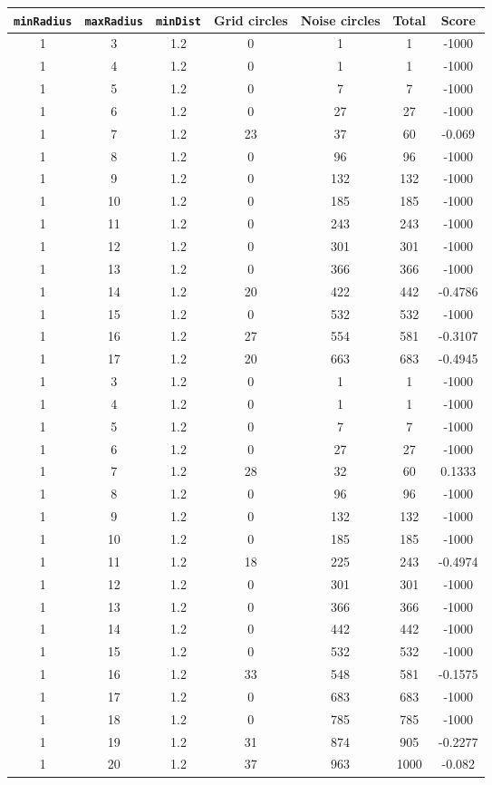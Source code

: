 \documentclass[letterpaper, 12pt]{article}
\begin{document}
\begin{longtable}{|c|c|c|c|c|c|c|}
\hline
\textbf{\texttt{minRadius}} & \textbf{\texttt{maxRadius}} & \textbf{\texttt{minDist}} & \textbf{Grid circles} & \textbf{Noise circles} & \textbf{Total} & \textbf{Score} \\
\hline
1 & 3 & 1.2 & 0 & 1 & 1 & -1000 \\
\hline
1 & 4 & 1.2 & 0 & 1 & 1 & -1000 \\
\hline
1 & 5 & 1.2 & 0 & 7 & 7 & -1000 \\
\hline
1 & 6 & 1.2 & 0 & 27 & 27 & -1000 \\
\hline
1 & 7 & 1.2 & 23 & 37 & 60 & -0.069 \\
\hline
1 & 8 & 1.2 & 0 & 96 & 96 & -1000 \\
\hline
1 & 9 & 1.2 & 0 & 132 & 132 & -1000 \\
\hline
1 & 10 & 1.2 & 0 & 185 & 185 & -1000 \\
\hline
1 & 11 & 1.2 & 0 & 243 & 243 & -1000 \\
\hline
1 & 12 & 1.2 & 0 & 301 & 301 & -1000 \\
\hline
1 & 13 & 1.2 & 0 & 366 & 366 & -1000 \\
\hline
1 & 14 & 1.2 & 20 & 422 & 442 & -0.4786 \\
\hline
1 & 15 & 1.2 & 0 & 532 & 532 & -1000 \\
\hline
1 & 16 & 1.2 & 27 & 554 & 581 & -0.3107 \\
\hline
1 & 17 & 1.2 & 20 & 663 & 683 & -0.4945 \\
\hline
1 & 3 & 1.2 & 0 & 1 & 1 & -1000 \\
\hline
1 & 4 & 1.2 & 0 & 1 & 1 & -1000 \\
\hline
1 & 5 & 1.2 & 0 & 7 & 7 & -1000 \\
\hline
1 & 6 & 1.2 & 0 & 27 & 27 & -1000 \\
\hline
1 & 7 & 1.2 & 28 & 32 & 60 & 0.1333 \\
\hline
1 & 8 & 1.2 & 0 & 96 & 96 & -1000 \\
\hline
1 & 9 & 1.2 & 0 & 132 & 132 & -1000 \\
\hline
1 & 10 & 1.2 & 0 & 185 & 185 & -1000 \\
\hline
1 & 11 & 1.2 & 18 & 225 & 243 & -0.4974 \\
\hline
1 & 12 & 1.2 & 0 & 301 & 301 & -1000 \\
\hline
1 & 13 & 1.2 & 0 & 366 & 366 & -1000 \\
\hline
1 & 14 & 1.2 & 0 & 442 & 442 & -1000 \\
\hline
1 & 15 & 1.2 & 0 & 532 & 532 & -1000 \\
\hline
1 & 16 & 1.2 & 33 & 548 & 581 & -0.1575 \\
\hline
1 & 17 & 1.2 & 0 & 683 & 683 & -1000 \\
\hline
1 & 18 & 1.2 & 0 & 785 & 785 & -1000 \\
\hline
1 & 19 & 1.2 & 31 & 874 & 905 & -0.2277 \\
\hline
1 & 20 & 1.2 & 37 & 963 & 1000 & -0.082 \\
\hline
\end{longtable}
\end{document}
